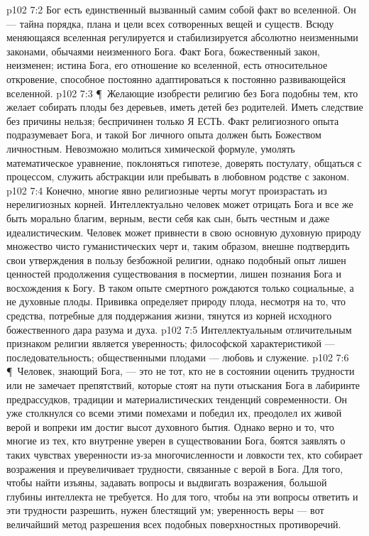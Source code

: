 \vs p102 7:2 Бог есть единственный вызванный самим собой факт во вселенной. Он --- тайна порядка, плана и цели всех сотворенных вещей и существ. Всюду меняющаяся вселенная регулируется и стабилизируется абсолютно неизменными законами, обычаями неизменного Бога. Факт Бога, божественный закон, неизменен; истина Бога, его отношение ко вселенной, есть относительное откровение, способное постоянно адаптироваться к постоянно развивающейся вселенной.
\vs p102 7:3 \P\ Желающие изобрести религию без Бога подобны тем, кто желает собирать плоды без деревьев, иметь детей без родителей. Иметь следствие без причины нельзя; беспричинен только Я ЕСТЬ. Факт религиозного опыта подразумевает Бога, и такой Бог личного опыта должен быть Божеством личностным. Невозможно молиться химической формуле, умолять математическое уравнение, поклоняться гипотезе, доверять постулату, общаться с процессом, служить абстракции или пребывать в любовном родстве с законом.
\vs p102 7:4 Конечно, многие явно религиозные черты могут произрастать из нерелигиозных корней. Интеллектуально человек может отрицать Бога и все же быть морально благим, верным, вести себя как сын, быть честным и даже идеалистическим. Человек может привнести в свою основную духовную природу множество чисто гуманистических черт и, таким образом, внешне подтвердить свои утверждения в пользу безбожной религии, однако подобный опыт лишен ценностей продолжения существования в посмертии, лишен познания Бога и восхождения к Богу. В таком опыте смертного рождаются только социальные, а не духовные плоды. Прививка определяет природу плода, несмотря на то, что средства, потребные для поддержания жизни, тянутся из корней исходного божественного дара разума и духа.
\vs p102 7:5 Интеллектуальным отличительным признаком религии является уверенность; философской характеристикой --- последовательность; общественными плодами --- любовь и служение.
\vs p102 7:6 \P\ Человек, знающий Бога, --- это не тот, кто не в состоянии оценить трудности или не замечает препятствий, которые стоят на пути отыскания Бога в лабиринте предрассудков, традиции и материалистических тенденций современности. Он уже столкнулся со всеми этими помехами и победил их, преодолел их живой верой и вопреки им достиг высот духовного бытия. Однако верно и то, что многие из тех, кто внутренне уверен в существовании Бога, боятся заявлять о таких чувствах уверенности из\hyp{}за многочисленности и ловкости тех, кто собирает возражения и преувеличивает трудности, связанные с верой в Бога. Для того, чтобы найти изъяны, задавать вопросы и выдвигать возражения, большой глубины интеллекта не требуется. Но для того, чтобы на эти вопросы ответить и эти трудности разрешить, нужен блестящий ум; уверенность веры --- вот величайший метод разрешения всех подобных поверхностных противоречий.
